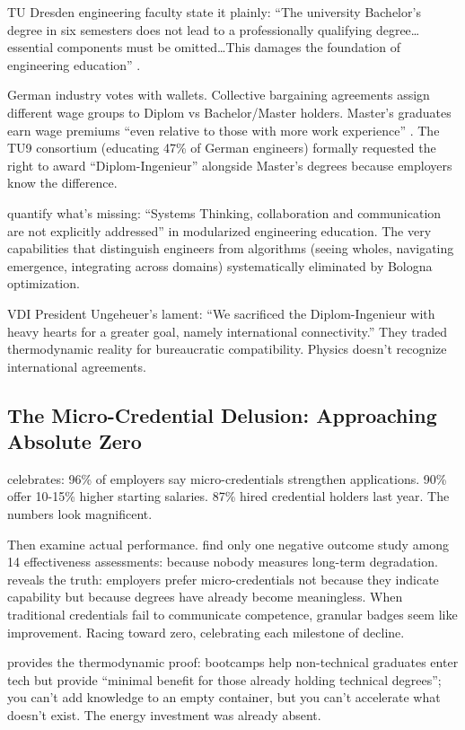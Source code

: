 TU Dresden engineering faculty state it plainly: ``The university Bachelor's degree in six semesters does not lead to a professionally qualifying degree\ldots essential components must be omitted\ldots This damages the foundation of engineering education'' \citep{odenbach2015}.

German industry votes with wallets. Collective bargaining agreements assign different wage groups to Diplom vs Bachelor/Master holders. Master's graduates earn wage premiums ``even relative to those with more work experience'' \citep{wieschke2020}. The TU9 consortium (educating 47\% of German engineers) formally requested the right to award ``Diplom-Ingenieur'' alongside Master's degrees because employers know the difference.

\citet{kaiser2022} quantify what's missing: ``Systems Thinking, collaboration and communication are not explicitly addressed'' in modularized engineering education. The very capabilities that distinguish engineers from algorithms (seeing wholes, navigating emergence, integrating across domains) systematically eliminated by Bologna optimization.

VDI President Ungeheuer's lament: ``We sacrificed the Diplom-Ingenieur with heavy hearts for a greater goal, namely international connectivity.'' They traded thermodynamic reality for bureaucratic compatibility. Physics doesn't recognize international agreements.

\subsection{The Micro-Credential Delusion: Approaching Absolute Zero}

\citet{lumina2025} celebrates: 96\% of employers say micro-credentials strengthen applications. 90\% offer 10-15\% higher starting salaries. 87\% hired credential holders last year. The numbers look magnificent.

Then examine actual performance. \citet{ha2022} find only one negative outcome study among 14 effectiveness assessments: because nobody measures long-term degradation. \citet{gauthier2020} reveals the truth: employers prefer micro-credentials not because they indicate capability but because degrees have already become meaningless. When traditional credentials fail to communicate competence, granular badges seem like improvement. Racing toward zero, celebrating each milestone of decline.

\citet{joshi2019} provides the thermodynamic proof: bootcamps help non-technical graduates enter tech but provide ``minimal benefit for those already holding technical degrees''; you can't add knowledge to an empty container, but you can't accelerate what doesn't exist. The energy investment was already absent.

